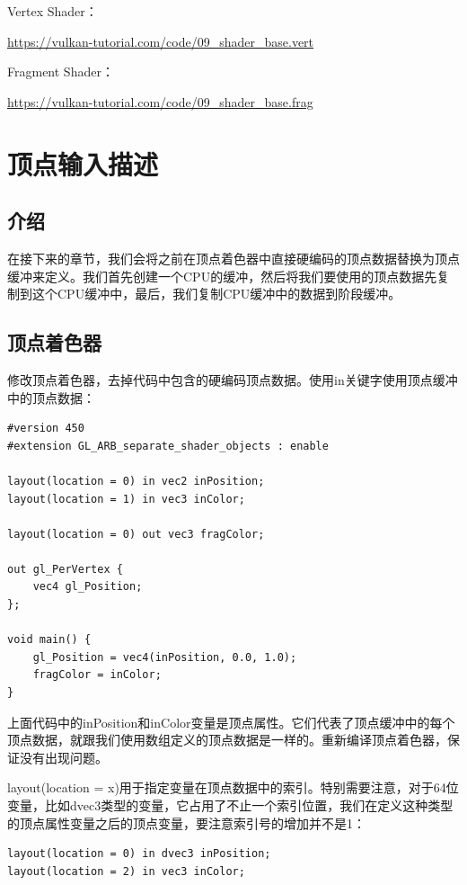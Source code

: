 \documentclass{ctexart}
\begin{document}
Vertex Shader：

\url{https://vulkan-tutorial.com/code/09_shader_base.vert}

Fragment Shader：

\url{https://vulkan-tutorial.com/code/09_shader_base.frag}

\newpage
\section{顶点输入描述}

\subsection{介绍}

在接下来的章节，我们会将之前在顶点着色器中直接硬编码的顶点数据替换为顶点缓冲来定义。我们首先创建一个CPU的缓冲，然后将我们要使用的顶点数据先复制到这个CPU缓冲中，最后，我们复制CPU缓冲中的数据到阶段缓冲。

\subsection{顶点着色器}

修改顶点着色器，去掉代码中包含的硬编码顶点数据。使用in关键字使用顶点缓冲中的顶点数据：

\begin{lstlisting}[language={[ANSI]C}]
#version 450
#extension GL_ARB_separate_shader_objects : enable

layout(location = 0) in vec2 inPosition;
layout(location = 1) in vec3 inColor;

layout(location = 0) out vec3 fragColor;

out gl_PerVertex {
	vec4 gl_Position;
};

void main() {
	gl_Position = vec4(inPosition, 0.0, 1.0);
	fragColor = inColor;
}
\end{lstlisting}

上面代码中的inPosition和inColor变量是顶点属性。它们代表了顶点缓冲中的每个顶点数据，就跟我们使用数组定义的顶点数据是一样的。重新编译顶点着色器，保证没有出现问题。

layout(location = x)用于指定变量在顶点数据中的索引。特别需要注意，对于64位变量，比如dvec3类型的变量，它占用了不止一个索引位置，我们在定义这种类型的顶点属性变量之后的顶点变量，要注意索引号的增加并不是1：

\begin{lstlisting}[language={[ANSI]C}]
layout(location = 0) in dvec3 inPosition;
layout(location = 2) in vec3 inColor;
\end{lstlisting}
\end{document}

